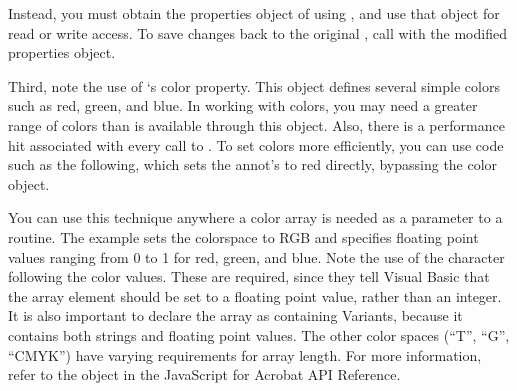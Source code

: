 \documentclass[letterpaper,12pt,english,openany,oneside]{sphinxmanual}
\begin{document}
Instead, you must obtain the properties object of  using , and use that object for read or write access. To save changes back to the original , call  with the modified properties object.

Third, note the use of  ‘s color property. This object defines several simple colors such as red, green, and blue. In working with colors, you may need a greater range of colors than is available through this object. Also, there is a performance hit associated with every call to . To set colors more efficiently, you can use code such as the following, which sets the annot’s  to red directly, bypassing the color object.

\begin{sphinxVerbatim}[commandchars=\\\{\}]
     
  
  
  
  
  
\end{sphinxVerbatim}

You can use this technique anywhere a color array is needed as a parameter to a  routine. The example sets the colorspace to RGB and specifies floating point values ranging from 0 to 1 for red, green, and blue. Note the use of the \sphinxcode{\sphinxupquote{\#}} character following the color values. These are required, since they tell Visual Basic that the array element should be set to a floating point value, rather than an integer. It is also important to declare the array as containing Variants, because it contains both strings and floating point values. The other color spaces (“T”, “G”, “CMYK”) have varying requirements for array length. For more information, refer to the  object in the JavaScript for Acrobat API Reference.
\end{document}
